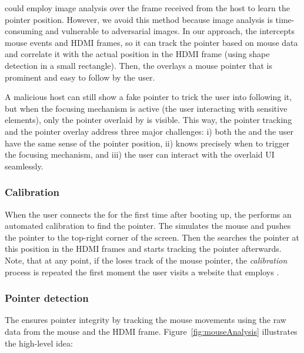 \device could employ image analysis over the frame received from the host to learn the pointer position. However, we avoid this method because image analysis is time-consuming and vulnerable to adversarial images. In our approach, the \device intercepts mouse events and HDMI frames, so it can track the pointer based on mouse data and correlate it with the actual position in the HDMI frame (using shape detection in a small rectangle). Then, the \device overlays a mouse pointer that is prominent and easy to follow by the user. 

A malicious host can still show a fake pointer to trick the user into following it, but when the focusing mechanism is active (the user interacting with sensitive elements), only the pointer overlaid by \device is visible. This way, the pointer tracking and the pointer overlay address three major challenges: i) both the \device and the user have the same sense of the pointer position, ii) \device knows precisely when to trigger the focusing mechanism, and iii) the user can interact with the overlaid UI seamlessly. 


\subsubsection{\bfseries Calibration}\label{sec:systemDesign:analysis:calibration} When the user connects the \device for the first time after booting up, the \device performs an automated calibration to find the pointer. The \device simulates the mouse and pushes the pointer to the top-right corner of the screen. Then the \device searches the pointer at this position in the HDMI frames
and starts tracking the pointer afterwards. Note, that at any point, if the \device loses track of the mouse pointer, the \emph{calibration} process is repeated the first moment the user visits a website that employs \name.

\subsubsection{\bfseries Pointer detection} The \device ensures pointer integrity by tracking the mouse movements using the raw data from the mouse and the HDMI frame.  Figure~\ref{fig:mouseAnalysis} illustrates the high-level idea: 

